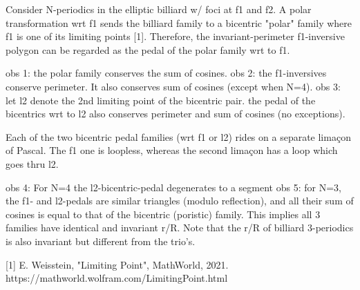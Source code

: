 Consider N-periodics in the elliptic billiard w/ foci at f1 and f2. A polar transformation wrt f1 sends the billiard family to a bicentric "polar" family where f1 is one of its limiting points [1]. Therefore, the invariant-perimeter f1-inversive polygon can be regarded as the pedal of the polar family wrt to f1. 

obs 1: the polar family  conserves the sum of cosines.
obs 2: the f1-inversives conserve perimeter. It also conserves sum of cosines (except when N=4).
obs 3: let l2 denote the 2nd limiting point of the bicentric pair. the pedal of the bicentrics wrt to l2 also conserves perimeter and sum of cosines (no exceptions).

Each of the two bicentric pedal families (wrt f1 or l2) rides on a separate limaçon of Pascal. The f1 one is loopless, whereas the second limaçon has a loop which goes thru l2.

obs 4: For N=4 the l2-bicentric-pedal degenerates to a segment
obs 5: for N=3, the f1- and l2-pedals are similar triangles (modulo reflection), and all their sum of cosines is equal to that of the bicentric (poristic) family. This implies all 3 families have identical and invariant r/R. Note that the  r/R of billiard 3-periodics is also invariant but different from the trio's.

[1] E. Weisstein, "Limiting Point", MathWorld, 2021. https://mathworld.wolfram.com/LimitingPoint.html